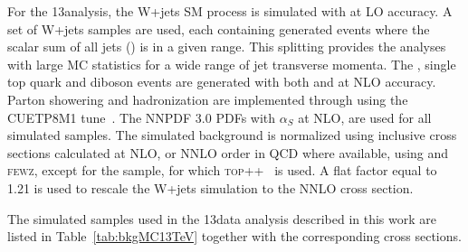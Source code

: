 For the 13\TeV analysis, the W+jets SM process is simulated with \amcatnlo{} at LO accuracy.
A set of W+jets samples are used, each containing generated events where the scalar \pt sum of all jets (\HT) is in a given range.
This splitting provides the analyses with large MC statistics for a wide range of jet transverse momenta.
The \ttbar, single top quark and diboson events are generated with both \POWHEG{} and \amcatnlo{} at NLO accuracy.
Parton showering and hadronization are implemented through  using the CUETP8M1 tune~\cite{Skands:2014pea,Khachatryan:2015pea}.
The NNPDF 3.0 PDFs with $\alpha_S$ at NLO, are used for all simulated samples. 
The simulated background is normalized using inclusive cross sections calculated at NLO, or NNLO order in QCD where available, using \MCFM{} and \textsc{fewz},
except for the \ttbar sample, for which \textsc{top++}~\cite{Czakon:2011xx} is used.
A flat factor equal to 1.21 is used to rescale the W+jets simulation to the NNLO cross section.

The simulated samples used in the 13\TeV data analysis described in this work are listed in Table~\ref{tab:bkgMC13TeV} together with the corresponding cross sections.

